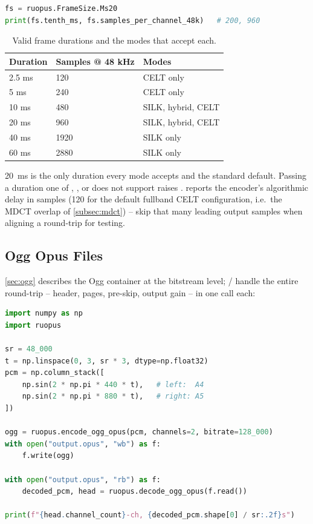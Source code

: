 \begin{lstlisting}[language=Python]
fs = ruopus.FrameSize.Ms20
print(fs.tenth_ms, fs.samples_per_channel_48k)   # 200, 960
\end{lstlisting}

\begin{table}[h]
  \centering
  \begin{tabular}{lll}
    \toprule
    Duration & Samples @ 48 kHz & Modes \\
    \midrule
    2.5 ms & 120  & CELT only \\
    5 ms   & 240  & CELT only \\
    10 ms  & 480  & SILK, hybrid, CELT \\
    20 ms  & 960  & SILK, hybrid, CELT \\
    40 ms  & 1920 & SILK only \\
    60 ms  & 2880 & SILK only \\
    \bottomrule
  \end{tabular}
  \caption{Valid frame durations and the modes that accept each.}
  \label{tab:frame_sizes_py}
\end{table}

20~ms is the only duration every mode accepts and the standard default.
Passing a duration one of , , or
 does not support raises .
 reports the
encoder's algorithmic delay in samples (120 for the default fullband CELT
configuration, i.e.\ the MDCT overlap of \cref{subsec:mdct}) -- skip that many
leading output samples when aligning a round-trip for testing.

\subsection{Ogg Opus Files}\label{subsec:python_ogg}

\cref{sec:ogg} describes the Ogg container at the bitstream level;
/ handle the entire
round-trip -- header, pages, pre-skip, output gain -- in one call each:

\begin{lstlisting}[language=Python]
import numpy as np
import ruopus

sr = 48_000
t = np.linspace(0, 3, sr * 3, dtype=np.float32)
pcm = np.column_stack([
    np.sin(2 * np.pi * 440 * t),   # left:  A4
    np.sin(2 * np.pi * 880 * t),   # right: A5
])

ogg = ruopus.encode_ogg_opus(pcm, channels=2, bitrate=128_000)
with open("output.opus", "wb") as f:
    f.write(ogg)

with open("output.opus", "rb") as f:
    decoded_pcm, head = ruopus.decode_ogg_opus(f.read())

print(f"{head.channel_count}-ch, {decoded_pcm.shape[0] / sr:.2f}s")
\end{lstlisting}

